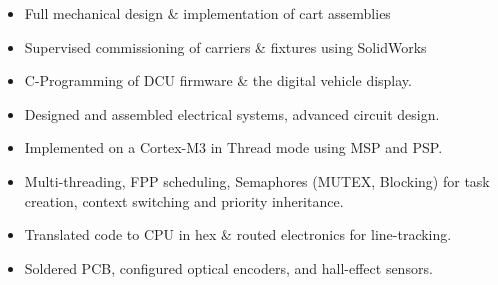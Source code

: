 \documentclass[10pt,a4paper]{altacv}
\begin{document}
\divider

%


\begin{itemize}
    \item Full mechanical design \& implementation of cart assemblies
    \item Supervised commissioning of carriers \& fixtures using SolidWorks
\end{itemize}

\medskip

%




\begin{itemize}
\item C-Programming of DCU firmware \& the digital vehicle display.
\item Designed and assembled electrical systems, advanced circuit design.
\end{itemize}

\divider


\begin{itemize}
  \item Implemented on a Cortex-M3 in Thread mode using MSP and PSP.
  \item Multi-threading, FPP scheduling, Semaphores (MUTEX, Blocking) for task creation, context switching and priority inheritance.
\end{itemize}

\divider


\begin{itemize}
  \item Translated code to CPU in hex \& routed electronics for line-tracking.
  \item Soldered PCB, configured optical encoders, and hall-effect sensors.
\end{itemize}

%
\end{document}
